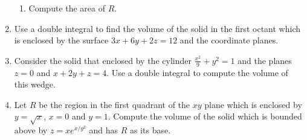 \documentclass[12pt]{article}
\newif\ifans
\begin{document}
\begin{enumerate}
\begin{enumerate}
\item Compute the area of $R$.

\ifans{\fbox{$\frac{32}{3}$}} \fi

\end{enumerate}

\item Use a double integral to find the volume of the solid in the first octant which is enclosed by the surface $3x+6y+2z=12$ and the coordinate planes.

\ifans{\fbox{8}} \fi

\item Consider the solid that enclosed by the cylinder $\frac{x^2}{9}+y^2=1$ and the planes $z=0$ and $x+2y+z=4$.  Use a double integral to compute the volume of this wedge.

\ifans{\fbox{$12\pi$}} \fi

\item Let $R$ be the region in the first quadrant of the $xy$ plane which is enclosed by $y=\sqrt{x}$, $x=0$ and $y=1$.  Compute the volume of the solid which is bounded above by $z=xe^{x/y^2}$ and has $R$ as its base.

\ifans{\fbox{$\frac{1}{5}$}} \fi

\end{enumerate}
\end{document}
